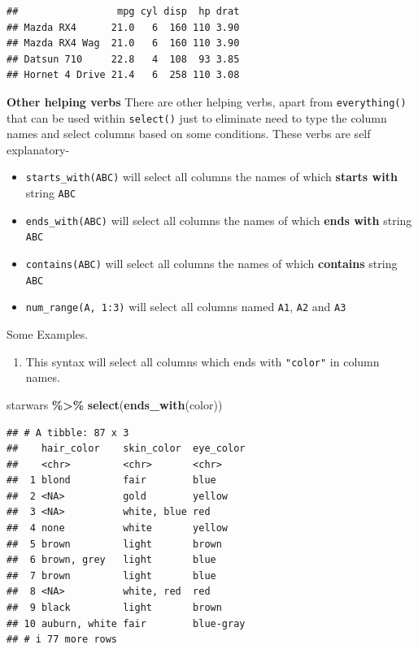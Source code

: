 \documentclass[
]{book}
\newenvironment{Shaded}{\begin{snugshade}}{\end{snugshade}}
\newcommand{\FunctionTok}[1]{\textcolor[rgb]{0.13,0.29,0.53}{\textbf{#1}}}
\newcommand{\NormalTok}[1]{#1}
\newcommand{\SpecialCharTok}[1]{\textcolor[rgb]{0.81,0.36,0.00}{\textbf{#1}}}
\newcommand{\StringTok}[1]{\textcolor[rgb]{0.31,0.60,0.02}{#1}}
\providecommand{\tightlist}{%
  \setlength{\itemsep}{0pt}\setlength{\parskip}{0pt}}
\begin{document}
\begin{verbatim}
##                 mpg cyl disp  hp drat
## Mazda RX4      21.0   6  160 110 3.90
## Mazda RX4 Wag  21.0   6  160 110 3.90
## Datsun 710     22.8   4  108  93 3.85
## Hornet 4 Drive 21.4   6  258 110 3.08
\end{verbatim}

\textbf{Other helping verbs}
There are other helping verbs, apart from \texttt{everything()} that can be used within \texttt{select()} just to eliminate need to type the column names and select columns based on some conditions. These verbs are self explanatory-

\begin{itemize}
\tightlist
\item
  \texttt{starts\_with(\textquotesingle{}ABC\textquotesingle{})} will select all columns the names of which \textbf{starts with} string \texttt{ABC}
\item
  \texttt{ends\_with(\textquotesingle{}ABC\textquotesingle{})} will select all columns the names of which \textbf{ends with} string \texttt{ABC}
\item
  \texttt{contains(\textquotesingle{}ABC\textquotesingle{})} will select all columns the names of which \textbf{contains} string \texttt{ABC}
\item
  \texttt{num\_range(\textquotesingle{}A\textquotesingle{},\ 1:3)} will select all columns named \texttt{A1}, \texttt{A2} and \texttt{A3}
\end{itemize}

Some Examples.

\begin{enumerate}
\def\labelenumi{\arabic{enumi}.}
\tightlist
\item
  This syntax will select all columns which ends with \texttt{"color"} in column names.
\end{enumerate}

\begin{Shaded}
\begin{Highlighting}[]
\NormalTok{starwars }\SpecialCharTok{\%\textgreater{}\%} 
  \FunctionTok{select}\NormalTok{(}\FunctionTok{ends\_with}\NormalTok{(}\StringTok{\textquotesingle{}color\textquotesingle{}}\NormalTok{))}
\end{Highlighting}
\end{Shaded}

\begin{verbatim}
## # A tibble: 87 x 3
##    hair_color    skin_color  eye_color
##    <chr>         <chr>       <chr>    
##  1 blond         fair        blue     
##  2 <NA>          gold        yellow   
##  3 <NA>          white, blue red      
##  4 none          white       yellow   
##  5 brown         light       brown    
##  6 brown, grey   light       blue     
##  7 brown         light       blue     
##  8 <NA>          white, red  red      
##  9 black         light       brown    
## 10 auburn, white fair        blue-gray
## # i 77 more rows
\end{verbatim}
\end{document}
